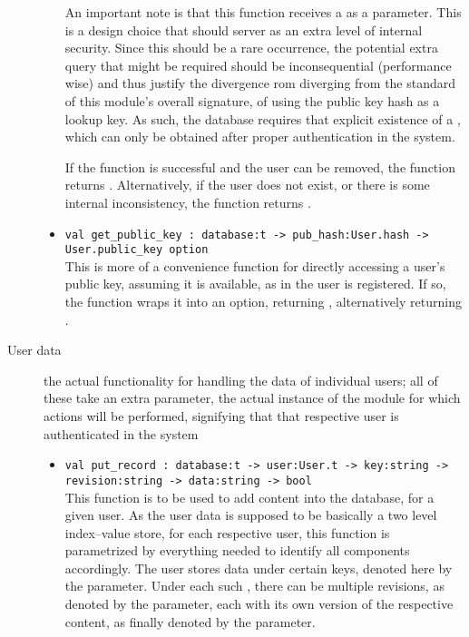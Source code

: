 \begin{description}
\begin{itemize}
  An important note is that this function receives a  as a parameter.
  This is a design choice that should server as an extra level of internal security.
  Since this should be a rare occurrence, the potential extra query that might be required should be inconsequential (performance wise) and thus justify the divergence rom diverging from the standard of this module's overall signature, of using the public key hash as a lookup key.
  As such, the database requires that explicit existence of a , which can only be obtained after proper authentication in the system.

  If the function is successful and the user can be removed, the function returns .
  Alternatively, if the user does not exist, or there is some internal inconsistency, the function returns .

  \item \verb|val get_public_key : database:t -> pub_hash:User.hash -> User.public_key option| \\
  This is more of a convenience function for directly accessing a user's public key, assuming it is available, as in the user is registered.
  If so, the function wraps it into an option, returning , alternatively returning .
  \end{itemize}
  \item[User data] the actual functionality for handling the data of individual users; all of these take an extra parameter, the actual instance of the  module for which actions will be performed, signifying that that respective user is authenticated in the system
  \begin{itemize}
  \item \verb|val put_record : database:t -> user:User.t -> key:string -> revision:string -> data:string -> bool| \\
  This function is to be used to add content into the database, for a given user.
  As the user data is supposed to be basically a two level index--value store, for each respective user, this function is parametrized by everything needed to identify all components accordingly.
  The user stores data under certain keys, denoted here by the  parameter.
  Under each such , there can be multiple revisions, as denoted by the   parameter, each with its own version of the respective content, as finally denoted by the  parameter.


\end{itemize}
\end{description}

